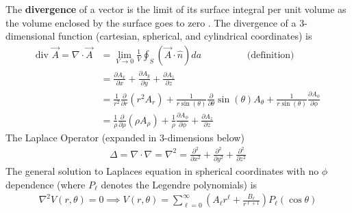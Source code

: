 The \textbf{divergence} of a vector is the limit of its surface integral per unit volume as the volume enclosed by the surface goes to zero \cite{bib:ReitzEMTheory}. The divergence of a 3-dimensional function (cartesian, spherical, and cylindrical coordinates) is
\begin{align}
\textrm{div }\vec{A}=\nabla \cdot \vec{A} &= \lim\limits_{V\rightarrow 0}\frac{1}{V}\oint_S (\vec{A}\cdot \hat{n}) da \hspace{2cm}\textrm{(definition)} \\ &=\frac{\partial A_x}{\partial x} + \frac{\partial A_y}{\partial y} + \frac{\partial A_z}{\partial z} \\
&= \frac{1}{r^2}\frac{\partial}{\partial r}(r^2A_r)+\frac{1}{r\sin(\theta)}\frac{\partial}{\partial \theta}\sin(\theta)A_\theta+\frac{1}{r\sin(\theta)} \frac{\partial A_\phi}{\partial \phi} \\
&= \frac{1}{\rho}\frac{\partial}{\partial \rho}(\rho A_\rho) + \frac{1}{\rho}\frac{\partial A_\phi}{\partial \phi}+ \frac{\partial A_z}{\partial z}
\end{align}
The Laplace Operator (expanded in 3-dimensions below)
\begin{align}
\Delta = \nabla \cdot \nabla = \nabla^2 =  \frac{\partial^2}{\partial x^2}+ \frac{\partial^2}{\partial y^2}+ \frac{\partial^2}{\partial z^2}
\end{align}
The general solution to Laplaces equation in spherical coordinates with no $\phi$ dependence (where $P_\ell$ denotes the Legendre polynomials) is
\begin{align}
	\nabla^2 V(r,\theta) = 0 \implies V(r,\theta) = \sum_{\ell=0}^{\infty}\left(A_\ell r^\ell+\frac{B_\ell}{r^{\ell+1}}\right)P_\ell(\cos\theta)
\end{align}



